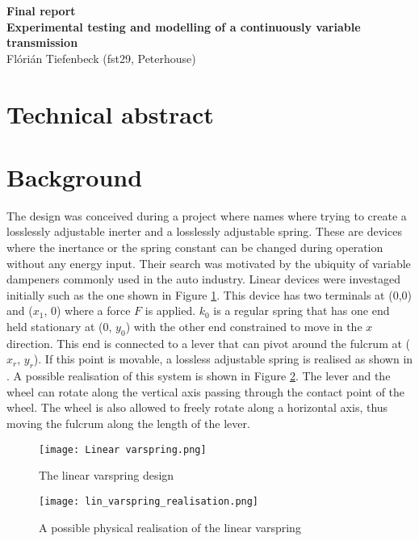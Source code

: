 \documentclass[12pt]{article}
\author{Flórián Tiefenbeck (fst29)}
\begin{document}
\begin{center}
{\Huge \bf Final report}\\
\vspace{6pt}
{\LARGE \bf Experimental testing and modelling of a continuously variable transmission}\\
\vspace{4pt}
{\LARGE Flórián Tiefenbeck (fst29, Peterhouse)}\\
\end{center}

\section{Technical abstract}

\section{Background}
The design was conceived during a project where \todo names where trying to create a losslessly adjustable inerter and a losslessly adjustable spring. These are devices where the inertance or the spring constant can be changed during operation without any energy input. Their search was motivated by the ubiquity of variable dampeners commonly used in the auto industry. Linear devices were investaged initially such as the one shown in Figure \ref{fig:linvarspring}. This device has two terminals at (0,0) and ($x_1$, 0) where a force $F$ is applied. $k_0$ is a regular spring that has one end held stationary at (0, $y_0$) with the other end constrained to move in the $x$ direction. This end is connected to a lever that can pivot around the fulcrum at ($x_r$, $y_r$). If this point is movable, a lossless adjustable spring is realised as shown in \cite{8718377}. A possible realisation of this system is shown in Figure \ref{fig:linvarspring_physical}. The lever and the wheel can rotate along the vertical axis passing through the contact point of the wheel. The wheel is also allowed to freely rotate along a horizontal axis, thus moving the fulcrum along the length of the lever. 


\begin{figure}[h]
    \centering
    \texttt{[image: Linear varspring.png]}
    \caption{The linear varspring design}
    \label{fig:linvarspring}
\end{figure}

\begin{figure}
    \centering
    \texttt{[image: lin\_varspring\_realisation.png]}
    \caption{A possible physical realisation of the linear varspring }
    \label{fig:linvarspring_physical}
\end{figure}
\end{document}
